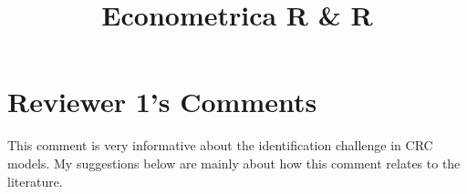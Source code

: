 \documentclass{article}[11pt]
\title{Econometrica R \& R}
\author{}
\date{}
\begin{document}
\setlength{\parindent}{0pt} %
\setlength{\parskip}{\smallskipamount}

\pagestyle{fancy}
\fancyhead{} %

\onehalfspacing

\section*{Reviewer 1's Comments}
This comment is very informative about the identification challenge in CRC models. My
suggestions below are mainly about how this comment relates to the literature.
\end{document}
